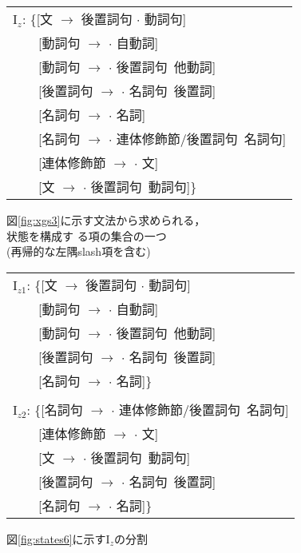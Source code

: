 \vspace{-1.5cm}
\begin{figure}[htbp]
  \begin{center}
    \begin{minipage}[b]{6.9cm}
      \begin{center}
        {\small
          \begin{tabular}[h]{l}
            I$_{z}$: \{[文 $\to$ 後置詞句 $\cdot$ 動詞句] \\
            　　[動詞句 $\to$ $\cdot$ 自動詞] \\ 
            　　[動詞句 $\to$ $\cdot$ 後置詞句\ 他動詞] \\ 
            　　[後置詞句 $\to$ $\cdot$ 名詞句\ 後置詞] \\ 
            　　[名詞句 $\to$ $\cdot$ 名詞] \\
            　　[名詞句 $\to$ $\cdot$ 連体修飾節/後置詞句\ 名詞句] \\
            　　[連体修飾節 $\to$ $\cdot$ 文] \\
            　　[文 $\to$ $\cdot$ 後置詞句\ 動詞句]\}
          \end{tabular}
          }
        \caption{図\ref{fig:xgs3}に示す文法から求められる，\\状態を構成す
          る項の集合の一つ\\(再帰的な左隅slash項を含む)}
        \label{fig:states6}
      \end{center}
    \end{minipage}
    
    \begin{minipage}[b]{7cm}
      \begin{center}
        {\small
          \begin{tabular}[h]{l}
            I$_{z1}$: \{[文 $\to$ 後置詞句 $\cdot$ 動詞句] \\
            　　[動詞句 $\to$ $\cdot$ 自動詞] \\ 
            　　[動詞句 $\to$ $\cdot$ 後置詞句\ 他動詞] \\ 
            　　[後置詞句 $\to$ $\cdot$ 名詞句\ 後置詞] \\ 
            　　[名詞句 $\to$ $\cdot$ 名詞]\} \\
            \\
            I$_{z2}$: \{[名詞句 $\to$ $\cdot$ 連体修飾節/後置詞句\ 名詞句] \\
            　　[連体修飾節 $\to$ $\cdot$ 文] \\
            　　[文 $\to$ $\cdot$ 後置詞句\ 動詞句]\\
            　　[後置詞句 $\to$ $\cdot$ 名詞句\ 後置詞] \\ 
            　　[名詞句 $\to$ $\cdot$ 名詞]\}
          \end{tabular}
          }
        \caption{図\ref{fig:states6}に示すI$_{z}$の分割\\ \\}
        \label{fig:states7}
      \end{center}
    \end{minipage}
  \end{center}
\end{figure}

